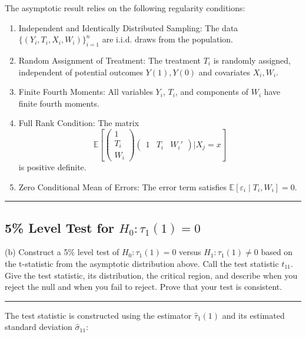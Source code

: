 \documentclass{article}
\newenvironment{colorparagraph}[1]{\par\color{#1}}{\par}
\begin{document}
The asymptotic result relies on the following regularity conditions:

\begin{enumerate}
    \item Independent and Identically Distributed Sampling: The data \( \{ (Y_i, T_i, X_i, W_i) \}_{i=1}^n \) are i.i.d. draws from the population.
    \item Random Assignment of Treatment: The treatment \( T_i \) is randomly assigned, independent of potential outcomes \( Y(1), Y(0) \) and covariates \( X_i, W_i \).
    \item Finite Fourth Moments: All variables \( Y_i \), \( T_i \), and components of \( W_i \) have finite fourth moments.
    \item Full Rank Condition: The matrix
    \[
    \mathbb{E}\left[ 
    \begin{pmatrix}
    1 \\
    T_i \\
    W_i
    \end{pmatrix}
    \begin{pmatrix}
    1 & T_i & W_i'
    \end{pmatrix}
    \Bigg| X_j = x
    \right]
    \]
    is positive definite.
    \item Zero Conditional Mean of Errors: The error term satisfies \( \mathbb{E}[ \varepsilon_i \mid T_i, W_i ] = 0 \).
\end{enumerate}


\begin{colorparagraph}{questioncolor}
\rule{\textwidth}{0.5pt}

\label{q1b}\subsection{5\% Level Test for \( H_0: \tau_1(1) = 0 \)}
(b) Construct a 5\% level test of \( H_0 : \tau_1(1) = 0 \) versus \( H_1 : \tau_1(1) \neq 0 \) based on the t-statistic from the asymptotic distribution above. Call the test statistic \( t_{11} \). Give the test statistic, its distribution, the critical region, and describe when you reject the null and when you fail to reject. Prove that your test is consistent.

\rule{\textwidth}{0.5pt}
\end{colorparagraph}

The test statistic is constructed using the estimator \( \hat{\tau}_1(1) \) and its estimated standard deviation \( \hat{\sigma}_{11} \):
\end{document}
